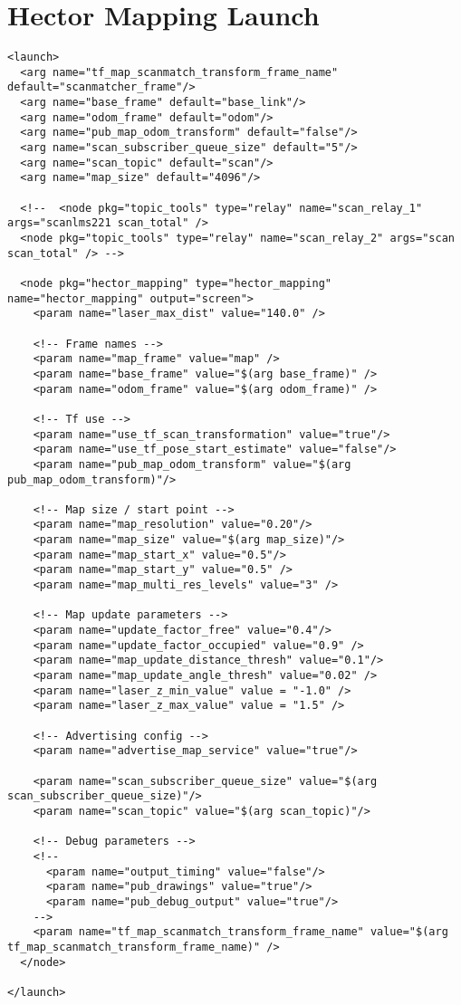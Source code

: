 \section{Hector Mapping Launch}
\begin{verbatim}
<launch>
  <arg name="tf_map_scanmatch_transform_frame_name" default="scanmatcher_frame"/>
  <arg name="base_frame" default="base_link"/>
  <arg name="odom_frame" default="odom"/>
  <arg name="pub_map_odom_transform" default="false"/>
  <arg name="scan_subscriber_queue_size" default="5"/>
  <arg name="scan_topic" default="scan"/>
  <arg name="map_size" default="4096"/>

  <!--  <node pkg="topic_tools" type="relay" name="scan_relay_1" args="scanlms221 scan_total" />
  <node pkg="topic_tools" type="relay" name="scan_relay_2" args="scan scan_total" /> -->
  
  <node pkg="hector_mapping" type="hector_mapping" name="hector_mapping" output="screen">
    <param name="laser_max_dist" value="140.0" />
    
    <!-- Frame names -->
    <param name="map_frame" value="map" />
    <param name="base_frame" value="$(arg base_frame)" />
    <param name="odom_frame" value="$(arg odom_frame)" />
    
    <!-- Tf use -->
    <param name="use_tf_scan_transformation" value="true"/>
    <param name="use_tf_pose_start_estimate" value="false"/>
    <param name="pub_map_odom_transform" value="$(arg pub_map_odom_transform)"/>
    
    <!-- Map size / start point -->
    <param name="map_resolution" value="0.20"/>
    <param name="map_size" value="$(arg map_size)"/>
    <param name="map_start_x" value="0.5"/>
    <param name="map_start_y" value="0.5" />
    <param name="map_multi_res_levels" value="3" />
    
    <!-- Map update parameters -->
    <param name="update_factor_free" value="0.4"/>
    <param name="update_factor_occupied" value="0.9" />    
    <param name="map_update_distance_thresh" value="0.1"/>
    <param name="map_update_angle_thresh" value="0.02" />
    <param name="laser_z_min_value" value = "-1.0" />
    <param name="laser_z_max_value" value = "1.5" />
    
    <!-- Advertising config --> 
    <param name="advertise_map_service" value="true"/>
    
    <param name="scan_subscriber_queue_size" value="$(arg scan_subscriber_queue_size)"/>
    <param name="scan_topic" value="$(arg scan_topic)"/>
    
    <!-- Debug parameters -->
    <!--
      <param name="output_timing" value="false"/>
      <param name="pub_drawings" value="true"/>
      <param name="pub_debug_output" value="true"/>
    -->
    <param name="tf_map_scanmatch_transform_frame_name" value="$(arg tf_map_scanmatch_transform_frame_name)" />
  </node>
    
</launch>
  
\end{verbatim}


